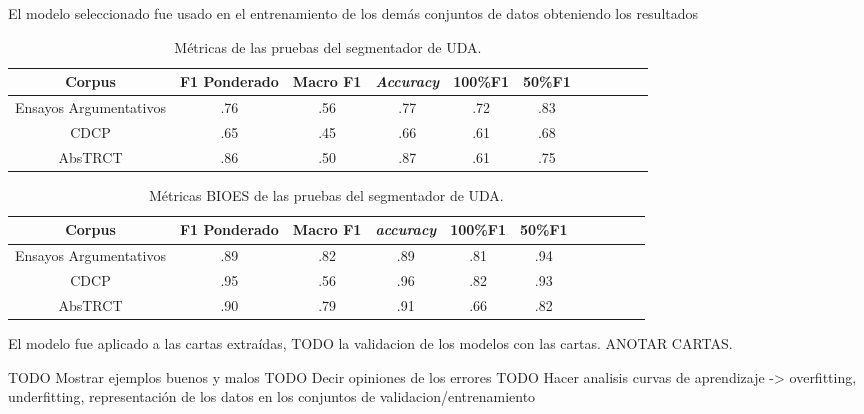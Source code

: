 El modelo seleccionado fue usado en el entrenamiento de los demás conjuntos de datos obteniendo los resultados

\begin{table}[h!]
	\begin{center}
		\begin{tabular}{|c|c|c|c|c|c|c|c|c|c|c|} \hline
        Corpus		            & F1 Ponderado  & Macro F1	& \emph{Accuracy} & 100\%F1 & 50\%F1  \\ \hline
        Ensayos Argumentativos  & .76           & .56 		& .77		      & .72	 & .83	       \\ \hline
        CDCP		            & .65           & .45 		& .66		      & .61	 & .68	       \\ \hline
        AbsTRCT	                & .86           & .50 		& .87		      & .61	 & .75	       \\ \hline
        \end{tabular}
	\caption{Métricas de las pruebas del segmentador de UDA.}\label{fig:test_metrics_segmenter}
	\end{center}
\end{table}
\begin{table}[h!]
	\begin{center}
		\begin{tabular}{|c|c|c|c|c|c|c|c|c|c|c|} \hline
        Corpus		            & F1 Ponderado  & Macro F1 & \emph{accuracy} & 100\%F1 &  50\%F1   \\ \hline
        Ensayos Argumentativos  & .89           & .82	   & .89             & .81	   & .94 	   \\ \hline
        CDCP		            & .95           & .56	   & .96	         & .82	   & .93 	   \\ \hline
        AbsTRCT	                & .90           & .79	   & .91	         & .66	   & .82 	   \\ \hline
        \end{tabular}
	\caption{Métricas BIOES de las pruebas del segmentador de UDA.}\label{fig:test_bioes_metrics_segmenter}
	\end{center}
\end{table}

El modelo fue aplicado a las cartas extraídas, TODO la validacion de los modelos con las cartas. ANOTAR CARTAS.

TODO Mostrar ejemplos buenos y malos
TODO Decir opiniones de los errores
TODO Hacer analisis curvas de aprendizaje -> overfitting, underfitting, representación de los datos en los conjuntos de validacion/entrenamiento

